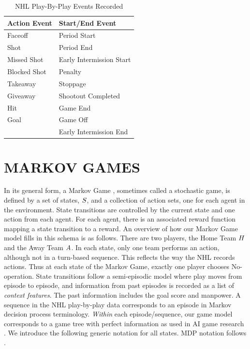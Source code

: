 \documentclass[]{article}
\begin{document}
\begin{table}[htb]
\caption{NHL Play-By-Play Events Recorded}
\label{table:events-recorded}
\begin{center}
\begin{tabular}{|l|l|}
\hline
 \bf{Action Event} & \bf{Start/End Event}\\ \hline
Faceoff & Period Start \\\hline
Shot & Period End \\\hline
Missed Shot & Early Intermission Start\\ \hline
Blocked Shot & Penalty\\ \hline
Takeaway & Stoppage\\  \hline
Giveaway & Shootout Completed\\ \hline
Hit & Game End\\ \hline
Goal & Game Off\\ \hline
& Early Intermission End \\
\hline
\end{tabular}
\end{center}
\end{table}



\section{MARKOV GAMES}
In its general form, a Markov Game \citep{Littman1994}, sometimes called a stochastic game, is defined by a set of states, $S$, and a collection of action sets, one for each agent in the environment. State transitions are controlled by the current state and one action from each agent. For each agent, there is an associated reward function mapping a state transition to a reward. An overview of how our Markov Game model fills in this schema is as follows. There are two players, the Home Team $H$ and the Away Team $A$.
In each state, only one team performs an action, although not in a turn-based sequence.
This reflects the way the NHL records actions.
Thus at each state of the Markov Game, exactly one player chooses No-operation.
State transitions follow a semi-episodic model \citep{bib:sutton} where play moves from episode to episode, and information from past episodes is recorded as a list of {\em context features}. The past information includes the goal score and manpower. A sequence in the NHL play-by-play data corresponds to an episode in Markov decision process terminology. {\em Within} each episode/sequence, our game model corresponds to a game tree with perfect information as used in AI game research \citep{Russell2010}. We introduce the following generic notation for all states. MDP notation follows \citep{Russell2010,Littman1994}.
\end{document}
